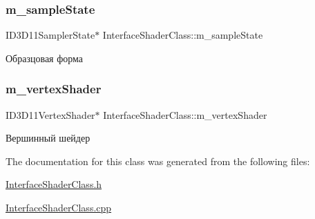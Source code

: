 \subsubsection{\texorpdfstring{m\+\_\+sample\+State}{m\_sampleState}}
{\footnotesize\ttfamily I\+D3\+D11\+Sampler\+State$\ast$ Interface\+Shader\+Class\+::m\+\_\+sample\+State\hspace{0.3cm}{\ttfamily [private]}}



Образцовая форма 

\mbox{\label{class_interface_shader_class_a849024b541179aaacad13c279840ea98}} 
\subsubsection{\texorpdfstring{m\+\_\+vertex\+Shader}{m\_vertexShader}}
{\footnotesize\ttfamily I\+D3\+D11\+Vertex\+Shader$\ast$ Interface\+Shader\+Class\+::m\+\_\+vertex\+Shader\hspace{0.3cm}{\ttfamily [private]}}



Вершинный шейдер 



The documentation for this class was generated from the following files\+:\begin{DoxyCompactItemize}
\item 
\hyperlink{_interface_shader_class_8h}{Interface\+Shader\+Class.\+h}\item 
\hyperlink{_interface_shader_class_8cpp}{Interface\+Shader\+Class.\+cpp}\end{DoxyCompactItemize}
